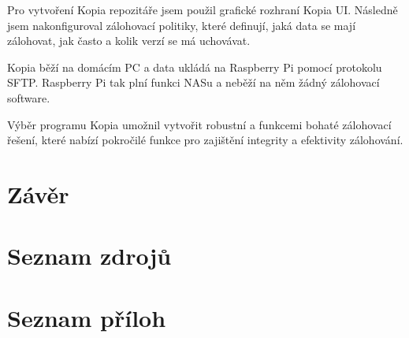 \documentclass[a4paper,12pt, oneside]{book}
\begin{document}
Pro vytvoření Kopia repozitáře jsem použil grafické rozhraní Kopia UI.
Následně jsem nakonfiguroval zálohovací politiky, které
definují, jaká data se mají zálohovat, jak často a kolik verzí se má uchovávat.

Kopia běží na domácím PC a data ukládá na Raspberry Pi pomocí protokolu SFTP.
Raspberry Pi tak plní funkci NASu a neběží na něm žádný zálohovací software.

Výběr programu Kopia umožnil vytvořit robustní a funkcemi bohaté zálohovací
řešení, které nabízí pokročilé funkce pro zajištění integrity a efektivity
zálohování.  










\chapter{Závěr}


\chapter{Seznam zdrojů}


\listoffigures


\chapter{Seznam příloh}
\end{document}
